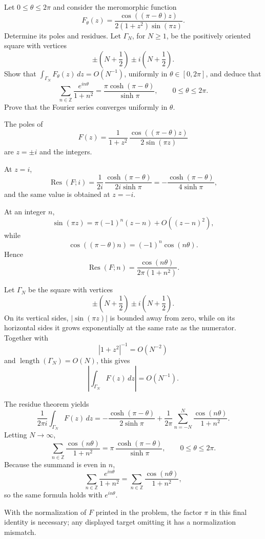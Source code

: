 \begin{problem}[CP-IV-0024]
\label{prob:cp-iv-0024}
Let \(0\le\theta\le2\pi\) and consider the meromorphic function
\[
F_\theta(z)=\frac{\cos((\pi-\theta)z)}{2(1+z^2)\sin(\pi z)}.
\]
Determine its poles and residues. Let \(\Gamma_N\), for \(N\ge1\), be the
positively oriented square with vertices
\[
\pm\left(N+\frac12\right)\pm i\left(N+\frac12\right).
\]
Show that \(\int_{\Gamma_N}F_\theta(z)\,dz=O(N^{-1})\), uniformly in
\(\theta\in[0,2\pi]\), and deduce that
\[
\boxed{\displaystyle
\sum_{n\in\mathbb Z}\frac{e^{in\theta}}{1+n^2}
=\frac{\pi\cosh(\pi-\theta)}{\sinh\pi},
\qquad 0\le\theta\le2\pi.}
\]
Prove that the Fourier series converges uniformly in \(\theta\).
\end{problem}



\begin{solution}
The poles of
\[
F(z)=\frac{1}{1+z^2}\,
\frac{\cos((\pi-\theta)z)}{2\sin(\pi z)}
\]
are \(z=\pm i\) and the integers.

At \(z=i\),
\[
\operatorname{Res}(F;i)
=
\frac{1}{2i}\,
\frac{\cosh(\pi-\theta)}{2i\sinh\pi}
=
-\frac{\cosh(\pi-\theta)}{4\sinh\pi},
\]
and the same value is obtained at \(z=-i\).

At an integer \(n\),
\[
\sin(\pi z)=\pi(-1)^n(z-n)+O((z-n)^2),
\]
while
\[
\cos((\pi-\theta)n)=(-1)^n\cos(n\theta).
\]
Hence
\[
\operatorname{Res}(F;n)
=
\frac{\cos(n\theta)}{2\pi(1+n^2)}.
\]

Let \(\Gamma_N\) be the square with vertices
\[
\pm\left(N+\frac12\right)
\pm i\left(N+\frac12\right).
\]
On its vertical sides, \(|\sin(\pi z)|\) is bounded away from zero, while on its horizontal sides it grows exponentially at the same rate as the numerator. Together with
\[
|1+z^2|^{-1}=O(N^{-2})
\]
and \(\operatorname{length}(\Gamma_N)=O(N)\), this gives
\[
\left|\int_{\Gamma_N}F(z)\,dz\right|=O(N^{-1}).
\]

The residue theorem yields
\[
\frac{1}{2\pi i}\int_{\Gamma_N}F(z)\,dz
=
-\frac{\cosh(\pi-\theta)}{2\sinh\pi}
+
\frac{1}{2\pi}
\sum_{n=-N}^{N}\frac{\cos(n\theta)}{1+n^2}.
\]
Letting \(N\to\infty\),
\[
\boxed{
\sum_{n\in\mathbb Z}\frac{\cos(n\theta)}{1+n^2}
=
\pi\,\frac{\cosh(\pi-\theta)}{\sinh\pi},
\qquad 0\le\theta\le2\pi.
}
\]
Because the summand is even in \(n\),
\[
\sum_{n\in\mathbb Z}\frac{e^{in\theta}}{1+n^2}
=
\sum_{n\in\mathbb Z}\frac{\cos(n\theta)}{1+n^2},
\]
so the same formula holds with \(e^{in\theta}\).

With the normalization of \(F\) printed in the problem, the factor \(\pi\) in this final identity is necessary; any displayed target omitting it has a normalization mismatch.
\end{solution}


